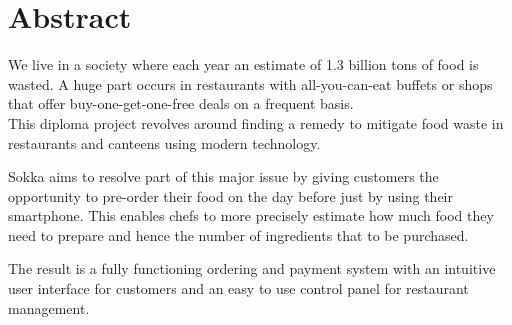 \section*{Abstract}

We live in a society where each year an estimate of 1.3 billion tons of food is wasted. A huge part occurs in restaurants with all-you-can-eat buffets or shops that offer buy-one-get-one-free deals on a frequent basis. \cite{depta2018} \\
This diploma project revolves around finding a remedy to mitigate food waste in restaurants and canteens using modern technology.

Sokka aims to resolve part of this major issue by giving customers the opportunity to pre-order their food on the day before just by using their smartphone. This enables chefs to more precisely estimate how much food they need to prepare and hence the number of ingredients that to be purchased.

The result is a fully functioning ordering and payment system with an intuitive user interface for customers and an easy to use control panel for restaurant management.

\newpage